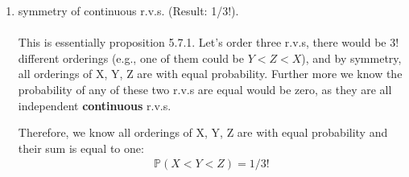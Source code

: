 \begin{exercise}[BH.5.56]
\begin{solution}
\begin{enumerate}
    	\item symmetry of continuous r.v.s. (Result: 1/3!).\\~\\
    	This is essentially proposition 5.7.1. 
    	Let's order three r.v.s, there would be 3! different orderings (e.g., one of them could be $Y<Z<X$), and by symmetry, all orderings of X, Y, Z are with equal probability. 
    	Further more we know the probability of any of these two r.v.s are equal would be zero, as they are all independent \textbf{continuous} r.v.s. 
    	
    	Therefore, we know all orderings of X, Y, Z are with equal probability and their sum is equal to one:   
    	\begin{align*}
    		\mathbb{P}(X<Y<Z) =1/3!
    	\end{align*} 
	\end{enumerate}
\end{solution}
\end{exercise}


